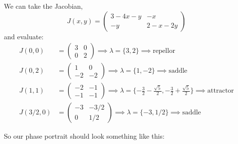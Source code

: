 \documentclass[12pt]{article}
\begin{document}
We can take the Jacobian,
\[J(x, y) = \begin{pmatrix}
        3 - 4x - y & -x         \\
        -y         & 2 - x - 2y
    \end{pmatrix}\]
and evaluate:
\begin{align*}
    J(0, 0)   & = \begin{pmatrix}
                      3 & 0 \\
                      0 & 2
                  \end{pmatrix} \implies \lambda = \{3, 2\} \implies \text{repellor}                                                                 \\
    J(0, 2)   & = \begin{pmatrix}
                      1  & 0  \\
                      -2 & -2
                  \end{pmatrix} \implies \lambda = \{1, -2\} \implies \text{saddle}                                                                  \\
    J(1, 1)   & = \begin{pmatrix}
                      -2 & -1 \\
                      -1 & -1
                  \end{pmatrix} \implies \lambda = \{-\frac{3}{2} - \frac{\sqrt 5}{2}, -\frac{3}{2} + \frac{\sqrt 5}{2}\}  \implies \text{attractor} \\
    J(3/2, 0) & = \begin{pmatrix}
                      -3 & -3/2 \\
                      0  & 1/2
                  \end{pmatrix} \implies \lambda = \{-3, 1/2\} \implies \text{saddle}
\end{align*}

So our phase portrait should look something like this:
\end{document}
